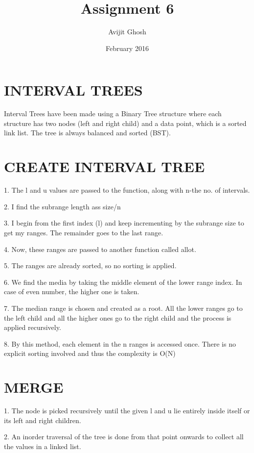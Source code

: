 \documentclass{article}
\title{Assignment 6}
\author{Avijit Ghosh }
\date{February 2016}
\begin{document}
\maketitle

\section{INTERVAL TREES}

Interval Trees have been made using a Binary Tree structure where each structure has two nodes (left and right child) and a data point, which is a sorted link list. The tree is always balanced and sorted (BST).

\section{CREATE INTERVAL TREE}

1. The l and u values are passed to the function, along with n-the no. of intervals.

2. I find the subrange length ass size/n

3. I begin from the first index (l) and keep incrementing by the subrange size to get my ranges. The remainder goes to the last range.

4. Now, these ranges are passed to another function called allot.

5. The ranges are already sorted, so no sorting is applied.

6. We find the media by taking the middle element of the lower range index. In case of even number, the higher one is taken.

7. The median range is chosen and created as a root. All the lower ranges go to the left child and all the higher ones go to the right child and the process is applied recursively.

8. By this method, each element in the n ranges is accessed once. There is no explicit sorting involved and thus the complexity is O(N) 

\section{MERGE}

1. The node is picked recursively until the given l and u lie entirely inside itself or its left and right children.

2. An inorder traversal of the tree is done from that point onwards to collect all the values in a linked list.
\end{document}
